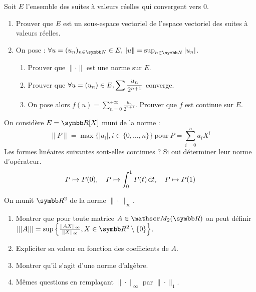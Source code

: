 \begin{exercice}
    Soit $E$ l'ensemble des suites à valeurs réelles qui convergent vers 0.
    \begin{enumerate}
        \item Prouver que $E$ est un sous-espace vectoriel de l'espace vectoriel des suites à valeurs réelles.
        \item On pose : $\forall u=(u_{n})_{n \in \N} \in E, \|u\| = \sup_{n \in \N} |u_{n}|$.
        \begin{enumerate}
            \item Prouver que $\|\cdot\|$ est une norme sur $E$.
            \item Prouver que $\displaystyle \forall u=(u_{n}) \in E, \sum \frac{u_{n}}{2^{n+1}}$ converge.
            \item On pose alors $\displaystyle f(u) = \sum_{n=0}^{+\infty} \frac{u_{n}}{2^{n+1}}$. Prouver que $f$ est continue sur $E$.
        \end{enumerate}
    \end{enumerate}
\end{exercice}

\begin{exercice}
    On considère $E=\R[X]$ muni de la norme :
    \[\|P\| = \max \{|a_{i}|, i \in \{0,\dots,n\}\}~\text{pour}~P = \sum_{i=0}^{n} a_{i} X^{i}\]
    Les formes linéaires suivantes sont-elles continues ? Si oui déterminer leur norme d'opérateur.
    \[P \mapsto P(0), \quad P \mapsto \int_{0}^{1} P(t) \,\mathrm{d}t, \quad P \mapsto P(1)\]
\end{exercice}

\begin{exercice}
    On munit $\R^{2}$ de la norme $\|\cdot\|_{\infty}$.
    \begin{enumerate}
        \item Montrer que pour toute matrice $A \in \mathscr M_{2}(\R)$ on peut définir 
            $|||A||| = \sup \left\{ \frac{\|AX\|_{\infty}}{\|X\|_{\infty}}, X \in \R^{2} \setminus \{0\} \right\}$.
        \item Expliciter sa valeur en fonction des coefficients de $A$.
        \item Montrer qu'il s'agit d'une norme d'algèbre.
        \item Mêmes questions en remplaçant $\|\cdot\|_{\infty}$ par $\|\cdot\|_{1}$.
    \end{enumerate}
\end{exercice}

